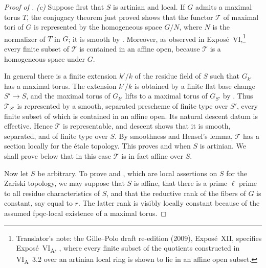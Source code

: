 \begin{proof}[Proof of ]
\emph{(c)} Suppose first that \(S\) is artinian and local. If \(G\)
admits a maximal torus \(T\), the conjugacy theorem just proved shows
that the functor \(\mathcal T\) of maximal tori of \(G\) is
represented by the homogeneous space \(G/N\), where \(N\) is the
normalizer of \(T\) in \(G\); it is smooth by \textup{}.
Moreover, as observed in Exposé~VI,\footnote{Translator's note: the
Gille--Polo draft re-edition (2009), Exposé~XII, specifies
Exposé~VI\textsubscript{A}, , where every finite
subset of the quotients constructed in VI\textsubscript{A}~3.2 over an
artinian local ring is shown to lie in an affine open subset.} every finite subset of
\(\mathcal T\) is contained in an affine open, because \(\mathcal T\)
is a homogeneous space under \(G\).

In general there is a finite extension \(k'/k\) of the residue field
of \(S\) such that \(G_{k'}\) has a maximal torus. The extension
\(k'/k\) is obtained by a finite flat base change \(S'\to S\), and
the maximal torus of \(G_{k'}\) lifts to a maximal torus of
\(G_{S'}\) by . Thus \(\mathcal T_{S'}\) is represented by
a smooth, separated prescheme of finite type over \(S'\), every
finite subset of which is contained in an affine open. Its natural
descent datum is effective. Hence \(\mathcal T\) is representable,
and descent shows that it is smooth, separated, and of finite type
over \(S\). By smoothness and Hensel's lemma, \(\mathcal T\) has a
section locally for the étale topology. This proves \textup{} and
\textup{} when \(S\) is artinian. We shall prove below that in
this case \(\mathcal T\) is in fact affine over \(S\).

Now let \(S\) be arbitrary. To prove \textup{} and \textup{},
which are local assertions on \(S\) for the Zariski topology, we may
suppose that \(S\) is affine, that there is a prime \(\ell\) prime
to all residue characteristics of \(S\), and that the reductive rank
of the fibers of \(G\) is constant, say equal to \(r\). The latter
rank is visibly locally constant because of the assumed fpqc-local
existence of a maximal torus.


\end{proof}
